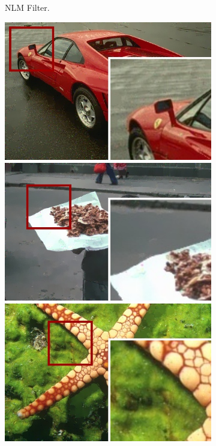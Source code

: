 \begin{figure}[!ht]
\begin{subfigure}[]{0.22\textwidth}
    \caption{NLM Filter.}
  \end{subfigure}\hfill
  \begin{subfigure}[]{0.22\textwidth}
    \centering
    \includegraphics[width=\textwidth]{./figures/sensor/berkeley/29030_edgefilter_frame.jpg}\vspace{0.1cm}\\
    \includegraphics[width=\textwidth]{./figures/sensor/berkeley/90076_edgefilter_frame.jpg}\vspace{0.1cm}\\
    \includegraphics[width=\textwidth]{./figures/sensor/berkeley/12003_edgefilter_frame.jpg}\vspace{0.1cm}\\

\end{subfigure}
\end{figure}
